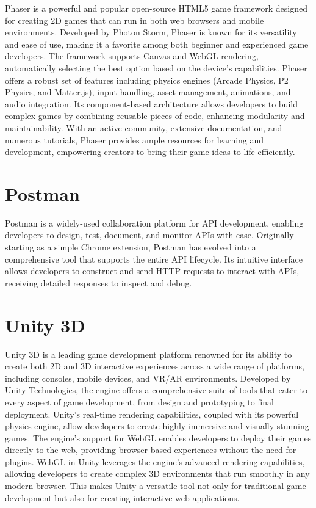 Phaser is a powerful and popular open-source HTML5 game framework designed for creating 2D games that can run in both web browsers and mobile environments. Developed by Photon Storm, Phaser is known for its versatility and ease of use, making it a favorite among both beginner and experienced game developers. The framework supports Canvas and WebGL rendering, automatically selecting the best option based on the device's capabilities. Phaser offers a robust set of features including physics engines (Arcade Physics, P2 Physics, and Matter.js), input handling, asset management, animations, and audio integration. Its component-based architecture allows developers to build complex games by combining reusable pieces of code, enhancing modularity and maintainability. With an active community, extensive documentation, and numerous tutorials, Phaser provides ample resources for learning and development, empowering creators to bring their game ideas to life efficiently.
\section*{Postman}
Postman is a widely-used collaboration platform for API development, enabling developers to design, test, document, and monitor APIs with ease. Originally starting as a simple Chrome extension, Postman has evolved into a comprehensive tool that supports the entire API lifecycle. Its intuitive interface allows developers to construct and send HTTP requests to interact with APIs, receiving detailed responses to inspect and debug.

\section*{Unity 3D}
Unity 3D is a leading game development platform renowned for its ability to create both 2D and 3D interactive experiences across a wide range of platforms, including consoles, mobile devices, and VR/AR environments. Developed by Unity Technologies, the engine offers a comprehensive suite of tools that cater to every aspect of game development, from design and prototyping to final deployment.
Unity’s real-time rendering capabilities, coupled with its powerful physics engine, allow developers to create highly immersive and visually stunning games. The engine's support for WebGL enables developers to deploy their games directly to the web, providing browser-based experiences without the need for plugins. WebGL in Unity leverages the engine's advanced rendering capabilities, allowing developers to create complex 3D environments that run smoothly in any modern browser. This makes Unity a versatile tool not only for traditional game development but also for creating interactive web applications.


